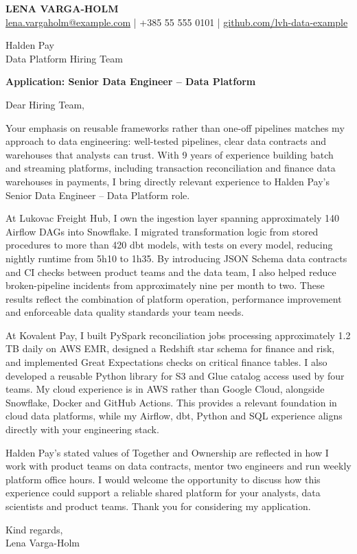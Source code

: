 \documentclass[11pt,a4paper]{article}
\begin{document}
{\Large\bfseries\color{primarycolor} LENA VARGA-HOLM}\\[0.3em]
{\small\href{mailto:lena.vargaholm@example.com}{lena.vargaholm@example.com} | +385 55 555 0101 | \href{https://github.com/lvh-data-example}{github.com/lvh-data-example}}

Halden Pay\\
Data Platform Hiring Team

\textbf{Application: Senior Data Engineer -- Data Platform}

Dear Hiring Team,

Your emphasis on reusable frameworks rather than one-off pipelines matches my approach to data engineering: well-tested pipelines, clear data contracts and warehouses that analysts can trust. With 9 years of experience building batch and streaming platforms, including transaction reconciliation and finance data warehouses in payments, I bring directly relevant experience to Halden Pay's Senior Data Engineer -- Data Platform role.

At Lukovac Freight Hub, I own the ingestion layer spanning approximately 140 Airflow DAGs into Snowflake. I migrated transformation logic from stored procedures to more than 420 dbt models, with tests on every model, reducing nightly runtime from 5h10 to 1h35. By introducing JSON Schema data contracts and CI checks between product teams and the data team, I also helped reduce broken-pipeline incidents from approximately nine per month to two. These results reflect the combination of platform operation, performance improvement and enforceable data quality standards your team needs.

At Kovalent Pay, I built PySpark reconciliation jobs processing approximately 1.2 TB daily on AWS EMR, designed a Redshift star schema for finance and risk, and implemented Great Expectations checks on critical finance tables. I also developed a reusable Python library for S3 and Glue catalog access used by four teams. My cloud experience is in AWS rather than Google Cloud, alongside Snowflake, Docker and GitHub Actions. This provides a relevant foundation in cloud data platforms, while my Airflow, dbt, Python and SQL experience aligns directly with your engineering stack.

Halden Pay's stated values of Together and Ownership are reflected in how I work with product teams on data contracts, mentor two engineers and run weekly platform office hours. I would welcome the opportunity to discuss how this experience could support a reliable shared platform for your analysts, data scientists and product teams. Thank you for considering my application.

Kind regards,\\
Lena Varga-Holm
\end{document}
